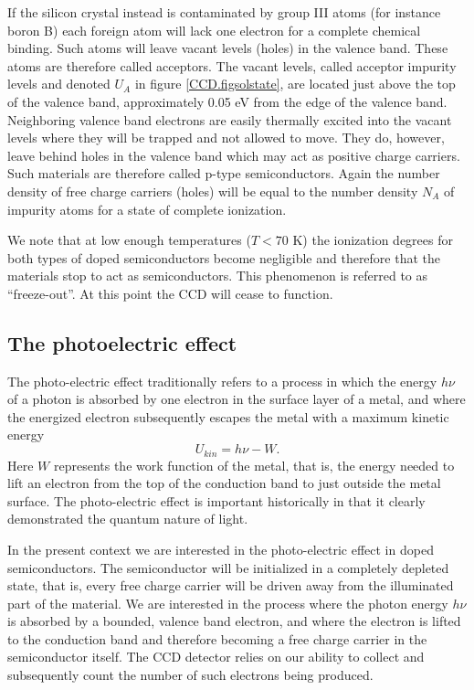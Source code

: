 If the silicon crystal instead is contaminated by group III atoms (for
instance boron B) each foreign atom will lack one electron for a
complete chemical binding. Such atoms will leave vacant levels (holes)
in the valence band. These atoms are therefore called acceptors.  The
vacant levels, called acceptor impurity levels and denoted $U_A$ in
figure \ref{CCD.figsolstate}, are located just above the top of the
valence band, approximately 0.05 eV from the edge of the valence band.
Neighboring valence band electrons are easily thermally excited into
the vacant levels where they will be trapped and not allowed to
move. They do, however, leave behind holes in the valence band which
may act as positive charge carriers. Such materials are therefore
called p-type semiconductors. Again the number density of free charge
carriers (holes) will be equal to the number density $N_A$ of impurity
atoms for a state of complete ionization.

We note that at low enough temperatures ($T < 70$ K) the ionization
degrees for both types of doped semiconductors become negligible and
therefore that the materials stop to act as semiconductors. This
phenomenon is referred to as ``freeze-out''. At this point the CCD
will cease to function.

\subsection{The photoelectric effect}

The photo-electric effect traditionally refers to a process in which
the energy $h\nu$ of a photon is absorbed by one electron in the
surface layer of a metal, and where the energized electron
subsequently escapes the metal with a maximum kinetic energy
\begin{equation}
  U_{kin} = h\nu - W.
\end{equation}
Here $W$ represents the work function of the metal, that is, the
energy needed to lift an electron from the top of the conduction band
to just outside the metal surface. The photo-electric effect is
important historically in that it clearly demonstrated the quantum
nature of light.

In the present context we are interested in the photo-electric effect
in doped semiconductors. The semiconductor will be initialized in a
completely depleted state, that is, every free charge carrier will be
driven away from the illuminated part of the material. We are
interested in the process where the photon energy $h\nu$ is absorbed
by a bounded, valence band electron, and where the electron is
lifted to the conduction band and therefore becoming a free charge
carrier in the semiconductor itself. The CCD detector relies on our 
ability to collect and subsequently count the number of such electrons
being produced.


